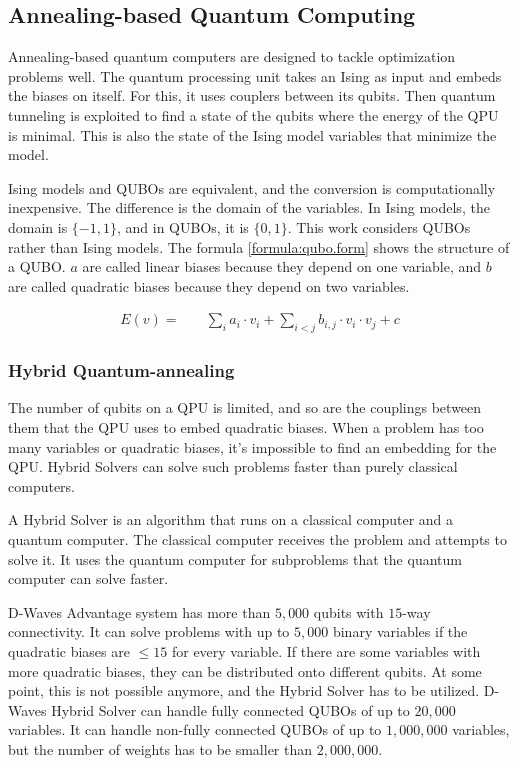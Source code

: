 \subsection{Annealing-based Quantum Computing}
\label{backg:annealing}

Annealing-based quantum computers are designed to tackle optimization problems well.
The quantum processing unit takes an Ising as input and embeds the biases on itself.
For this, it uses couplers between its qubits.
Then quantum tunneling is exploited to find a state of the qubits where the energy of the QPU is minimal.
This is also the state of the Ising model variables that minimize the model.
\cite{Boixo2013}

Ising models and QUBOs are equivalent, and the conversion is computationally inexpensive.
The difference is the domain of the variables.
\cite{Bian2010}
In Ising models, the domain is $\{-1, 1\}$, and in QUBOs, it is $\{0, 1\}$.
This work considers QUBOs rather than Ising models.
The formula \ref{formula:qubo.form} shows the structure of a QUBO.
$a$ are called linear biases because they depend on one variable, and $b$ are called quadratic biases because they depend on two variables.

\begin{align}
  \label{formula:qubo.form}
  E(v) = & \quad
  \sum_i a_i \cdot v_i
  + \sum_{i < j} b_{i, j} \cdot v_i \cdot v_j
  + c
\end{align}

\subsubsection{Hybrid Quantum-annealing}

The number of qubits on a QPU is limited, and so are the couplings between them that the QPU uses to embed quadratic biases.
When a problem has too many variables or quadratic biases, it's impossible to find an embedding for the QPU.
Hybrid Solvers can solve such problems faster than purely classical computers.
\cite{Bernoudy2020}

A Hybrid Solver is an algorithm that runs on a classical computer and a quantum computer.
The classical computer receives the problem and attempts to solve it.
It uses the quantum computer for subproblems that the quantum computer can solve faster.
\cite{Zhang2016}

D-Waves Advantage system has more than $5, 000$ qubits with $15$-way connectivity.
\cite{D-Wave2020}
It can solve problems with up to $5, 000$ binary variables if the quadratic biases are $\leq 15$ for every variable.
If there are some variables with more quadratic biases, they can be distributed onto different qubits.
At some point, this is not possible anymore, and the Hybrid Solver has to be utilized.
D-Waves Hybrid Solver can handle fully connected QUBOs of up to $20, 000$ variables.
It can handle non-fully connected QUBOs of up to $1, 000, 000$ variables, but the number of weights has to be smaller than $2, 000, 000$.
\cite{Bernoudy2020}

